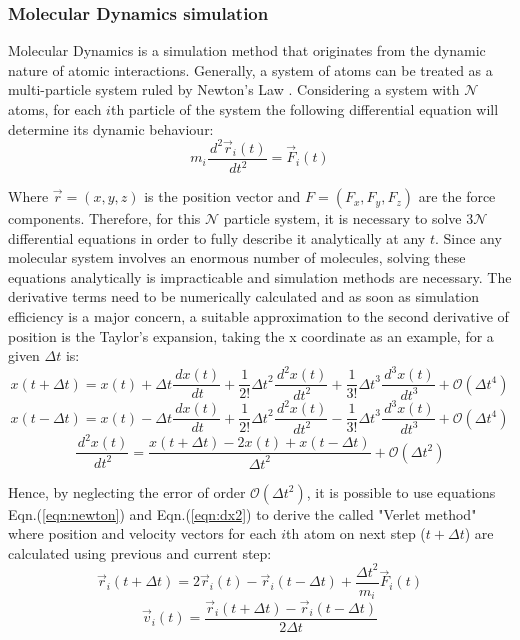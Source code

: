 \documentclass[10pt,a4paper,twoside]{article}
\begin{document}
\subsubsection{Molecular Dynamics simulation}

Molecular Dynamics is a simulation method that originates from the dynamic nature of atomic interactions. Generally, a system of atoms can be treated as a multi-particle system ruled by Newton's Law \cite{umd}. Considering a system with $\mathcal{N}$ atoms, for each $i$th particle of the system the following differential equation will determine its dynamic behaviour:
\begin{equation}
m_i\dfrac{\,d^2\vec{r}_i(t)}{\,dt^2} = \vec{F}_i(t)
\label{eqn:newton}
\end{equation}

Where $\vec{r} = (x,y,z)$ is the position vector and $F = (F_x, F_y, F_z)$ are the force components. Therefore, for this $\mathcal{N}$ particle system, it is necessary to solve $3\mathcal{N}$ differential equations in order to fully describe it analytically at any $t$. Since any molecular system involves an enormous number of molecules, solving these equations analytically is impracticable and simulation methods are necessary. The derivative terms need to be numerically calculated and as soon as simulation efficiency is a major concern, a suitable approximation to the second derivative of position is the Taylor's expansion, taking the x coordinate as an example, for a given $\Delta t$ is:
\begin{equation}
x(t+\Delta t) = x(t) + \Delta t \dfrac{\,dx(t)}{\,dt} + \dfrac{1}{2!}{\Delta t}^2 \dfrac{\,d^2x(t)}{\,dt^2} + \dfrac{1}{3!}{\Delta t}^3 \dfrac{\,d^3x(t)}{\,dt^3} +  \mathcal{O}(\Delta t^4)
\label{eqn:taylor1}
\end{equation}
\begin{equation}
x(t-\Delta t) = x(t) - \Delta t \dfrac{\,dx(t)}{\,dt} + \dfrac{1}{2!}{\Delta t}^2 \dfrac{\,d^2x(t)}{\,dt^2} - \dfrac{1}{3!}{\Delta t}^3 \dfrac{\,d^3x(t)}{\,dt^3} +  \mathcal{O}(\Delta t^4)
\label{eqn:taylor2}
\end{equation}
\begin{equation}
\dfrac{\,d^2x(t)}{\,dt^2} = \dfrac{x(t+\Delta t) - 2 x(t) + x(t-\Delta t)}{{\Delta t}^2} +  \mathcal{O}(\Delta t^2)
\label{eqn:dx2}
\end{equation}

Hence, by neglecting the error of order $\mathcal{O}(\Delta t^2)$, it is possible to use equations Eqn.(\ref{eqn:newton}) and Eqn.(\ref{eqn:dx2}) to derive the called "Verlet method" where position and velocity vectors for each $i$th atom on next step ($t+\Delta t$) are calculated using previous and current step:
\begin{equation}
\vec{r}_i(t+\Delta t) = 2 \vec{r}_i(t) - \vec{r}_i(t-\Delta t) + \dfrac{{\Delta t}^2}{m_i}\vec{F}_i(t)
\label{eqn:verletr}
\end{equation}
\begin{equation}
\vec{v}_i(t) =  \dfrac{\vec{r}_i(t+\Delta t) - \vec{r}_i(t-\Delta t)}{2{\Delta t}}
\label{eqn:verletv}
\end{equation}
\end{document}
